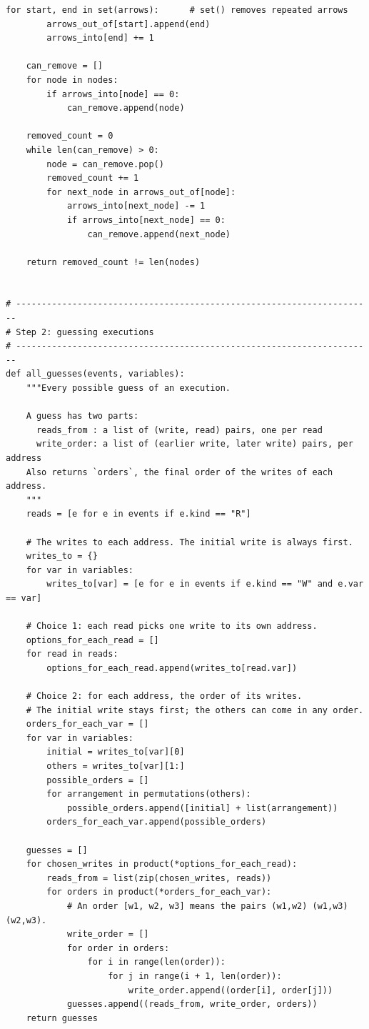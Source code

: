 \begin{lstlisting}[style=vspython]
    for start, end in set(arrows):      # set() removes repeated arrows
        arrows_out_of[start].append(end)
        arrows_into[end] += 1

    can_remove = []
    for node in nodes:
        if arrows_into[node] == 0:
            can_remove.append(node)

    removed_count = 0
    while len(can_remove) > 0:
        node = can_remove.pop()
        removed_count += 1
        for next_node in arrows_out_of[node]:
            arrows_into[next_node] -= 1
            if arrows_into[next_node] == 0:
                can_remove.append(next_node)

    return removed_count != len(nodes)


# ----------------------------------------------------------------------
# Step 2: guessing executions
# ----------------------------------------------------------------------
def all_guesses(events, variables):
    """Every possible guess of an execution.

    A guess has two parts:
      reads_from : a list of (write, read) pairs, one per read
      write_order: a list of (earlier write, later write) pairs, per address
    Also returns `orders`, the final order of the writes of each address.
    """
    reads = [e for e in events if e.kind == "R"]

    # The writes to each address. The initial write is always first.
    writes_to = {}
    for var in variables:
        writes_to[var] = [e for e in events if e.kind == "W" and e.var == var]

    # Choice 1: each read picks one write to its own address.
    options_for_each_read = []
    for read in reads:
        options_for_each_read.append(writes_to[read.var])

    # Choice 2: for each address, the order of its writes.
    # The initial write stays first; the others can come in any order.
    orders_for_each_var = []
    for var in variables:
        initial = writes_to[var][0]
        others = writes_to[var][1:]
        possible_orders = []
        for arrangement in permutations(others):
            possible_orders.append([initial] + list(arrangement))
        orders_for_each_var.append(possible_orders)

    guesses = []
    for chosen_writes in product(*options_for_each_read):
        reads_from = list(zip(chosen_writes, reads))
        for orders in product(*orders_for_each_var):
            # An order [w1, w2, w3] means the pairs (w1,w2) (w1,w3) (w2,w3).
            write_order = []
            for order in orders:
                for i in range(len(order)):
                    for j in range(i + 1, len(order)):
                        write_order.append((order[i], order[j]))
            guesses.append((reads_from, write_order, orders))
    return guesses



\end{lstlisting}
